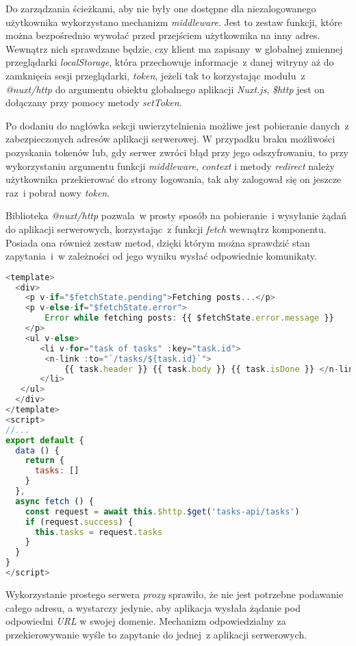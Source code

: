 Do zarządzania ścieżkami, aby nie były one dostępne dla niezalogowanego użytkownika wykorzystano mechanizm \textit{middleware}\cite{nuxtjs}. Jest to zestaw funkcji, które można bezpośrednio wywołać przed przejściem użytkownika na inny adres. Wewnątrz nich sprawdzane będzie, czy klient ma zapisany~w globalnej zmiennej przeglądarki \textit{localStorage}, która przechowuje informacje~z danej witryny aż do zamknięcia sesji przeglądarki\cite{mdn}, \textit{token}, jeżeli tak to korzystając modułu~z \textit{@nuxt/http} do argumentu obiektu globalnego aplikacji \textit{Nuxt.js}, \textit{\$http} jest on dołączany przy pomocy metody \textit{setToken}.

Po dodaniu do nagłówka sekcji uwierzytelnienia możliwe jest pobieranie danych~z zabezpieczonych adresów aplikacji serwerowej. W przypadku braku możliwości pozyskania tokenów lub, gdy serwer zwróci błąd przy jego odszyfrowaniu, to przy wykorzystaniu argumentu funkcji \textit{middleware}, \textit{context} i metody \textit{redirect} należy użytkownika przekierować do strony logowania, tak aby zalogował się on jeszcze raz~i pobrał nowy \textit{token}.

Biblioteka \textit{@nuxt/http} pozwala~w prosty sposób na pobieranie~i wysyłanie żądań do aplikacji serwerowych, korzystając~z funkcji \textit{fetch} wewnątrz komponentu\cite{nuxtjs}. Posiada ona również zestaw metod, dzięki którym można sprawdzić stan zapytania~i~w zależności od jego wyniku wysłać odpowiednie komunikaty.

\begin{lstlisting}[language=Javascript, caption={Przykład komponentu wczytującego listę zadań.}]
<template>
  <div>
   	<p v-if="$fetchState.pending">Fetching posts...</p>
   	<p v-else-if="$fetchState.error">
   		Error while fetching posts: {{ $fetchState.error.message }}
   	</p>
    <ul v-else>
       <li v-for="task of tasks" :key="task.id">
       	<n-link :to="`/tasks/${task.id}`">
       		{{ task.header }} {{ task.body }} {{ task.isDone }} </n-link>
       </li>
   </ul>
  </div>
</template>
<script>
//...
export default {
  data () {
    return {
      tasks: []
    }
  },
  async fetch () {
    const request = await this.$http.$get('tasks-api/tasks')
    if (request.success) {
      this.tasks = request.tasks
    }
  }
}
</script>
\end{lstlisting}

Wykorzystanie prostego serwera \textit{proxy} sprawiło, że nie jest potrzebne podawanie całego adresu, a wystarczy jedynie, aby aplikacja wysłała żądanie pod odpowiedni \textit{URL} w swojej domenie. Mechanizm odpowiedzialny za przekierowywanie wyśle to zapytanie do jednej~z aplikacji serwerowych.